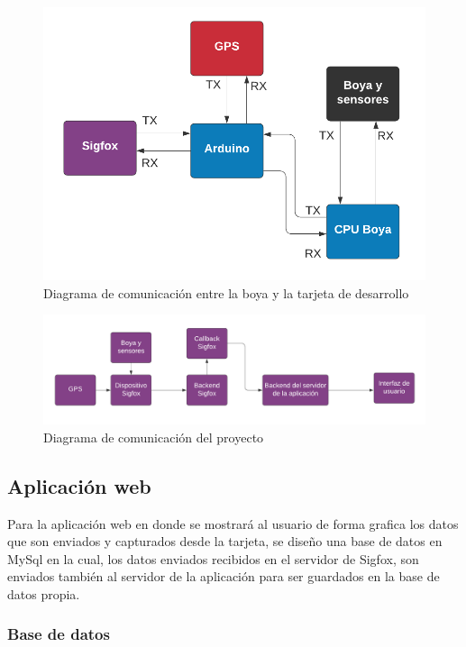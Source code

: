 \documentclass[12pt]{book}
\begin{document}
\begin{figure}[h]
	\centering
	\includegraphics[width=0.8\linewidth]{imagenes/diagramaBoya}
	\caption{Diagrama de comunicación entre la boya y la tarjeta de desarrollo}
	\label{fig:Diagrama de comunicación entre la boya y la tarjeta de desarrollo}
\end{figure}

\begin{figure}[h]
	\centering
	\includegraphics[width=0.8\linewidth]{imagenes/arquitecturaProyecto}
	\caption{Diagrama de comunicación del proyecto}
	\label{fig:Diagrama de comunicación del proyecto}
\end{figure}

\vspace{1cm}

\subsection{Aplicación web}
Para la aplicación web en donde se mostrará al usuario de forma grafica los datos que son enviados y capturados desde la tarjeta, se diseño una base de datos en MySql en la cual, los datos enviados recibidos en el servidor de Sigfox, son enviados también al servidor de la aplicación para ser guardados en la base de datos propia.

\subsubsection{Base de datos}
\end{document}
